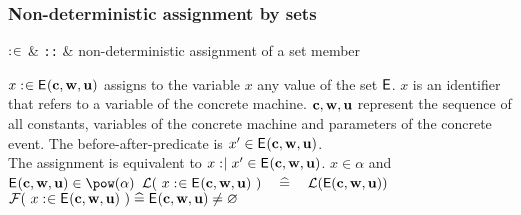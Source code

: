 \begin{samepage}
\subsubsection{Non-deterministic assignment by sets}
\begin{rrnames}
  $\mathrel{:\mkern1mu\in}$ & \texttt{::} & non-deterministic assignment of a set member
\end{rrnames}
\begin{rodinrefentry}
  \rrdesc
    $x \mathrel{:\mkern1mu\in} \textsf{E}_{}(\mathbf{c},\mathbf{w},\mathbf{u})$ assigns to the variable $x$ any value of the
    set $\textsf{E}$. $x$ is an identifier that refers to a variable
    of the concrete machine.
    $\mathbf{c},\mathbf{w},\mathbf{u}$ represent the sequence of all constants, 
    variables of the concrete machine and parameters of the concrete event.
  \rrdef
    The before-after-predicate is $x' \in \textsf{E}_{}(\mathbf{c},\mathbf{w},\mathbf{u})$. \\
    The assignment is equivalent to
    $x \mathrel{:\mkern1mu\mid} x' \in \textsf{E}_{}(\mathbf{c},\mathbf{w},\mathbf{u})$.
  \rrtypes
    $x\in\alpha$ and $\eventbassignmentexpr{}\in\pow(\alpha)$
  \rrwd
    $\mathcal{L}(~x \mathrel{:\mkern1mu\in}\textsf{E}_{}(\mathbf{c},\mathbf{w},\mathbf{u})~)
    \quad\mathrel{\widehat=}\quad
    \mathcal{L}(\textsf{E}(\mathbf{c},\mathbf{w},\mathbf{u}))$
  \rrfis
    $\mathcal{F}(~x \mathrel{:\mkern1mu\in} \textsf{E}_{}(\mathbf{c},\mathbf{w},\mathbf{u})~) \mathrel{\widehat=} \textsf{E}_{}(\mathbf{c},\mathbf{w},\mathbf{u})\neq\mathord\varnothing$
\end{rodinrefentry}
\end{samepage}

